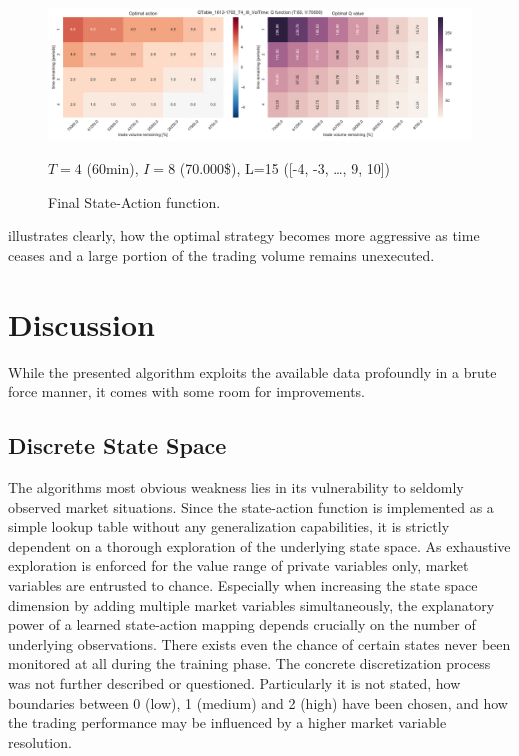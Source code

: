 \begin{figure}[ht]
	\centering
   \includegraphics[width=1.\textwidth]{content/drawings/heatmap_3months}
	\caption{Final State-Action function.}
	$T=4$ (60min), $I=8$ (70.000\$), L=15 ([-4, -3, \ldots{}, 9, 10])
	\label{fig:heatmap}
\end{figure}

 illustrates clearly, how the optimal strategy becomes more aggressive as time ceases and a large portion of the trading volume remains unexecuted.






\section{Discussion}
\label{chap:backwardalgorithm:discussion}
While the presented algorithm exploits the available data profoundly in a brute force manner, it comes with some room for improvements.\\

\subsection{Discrete State Space}
The algorithms most obvious weakness lies in its vulnerability to seldomly observed market situations. Since the state-action function is implemented as a simple lookup table without any generalization capabilities, it is strictly dependent on a thorough exploration of the underlying state space. As exhaustive exploration is enforced for the value range of private variables only, market variables are entrusted to chance. Especially when increasing the state space dimension by adding multiple market variables simultaneously, the explanatory power of a learned state-action mapping depends crucially on the number of underlying observations. There exists even the chance of certain states never been monitored at all during the training phase. The concrete discretization process was not further described or questioned. Particularly it is not stated, how boundaries between 0 (low), 1 (medium) and 2 (high) have been chosen, and how the trading performance may be influenced by a higher market variable resolution.


